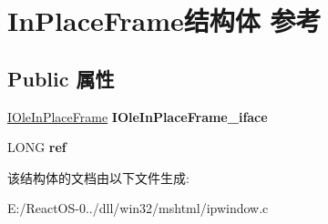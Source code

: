 \hypertarget{struct_in_place_frame}{}\section{In\+Place\+Frame结构体 参考}
\label{struct_in_place_frame}
\subsection*{Public 属性}
\begin{DoxyCompactItemize}
\item 
\mbox{\label{struct_in_place_frame_a806a9b7f7b3c9c891d8cfbcb86888657}} 
\hyperlink{interface_i_ole_in_place_frame}{I\+Ole\+In\+Place\+Frame} {\bfseries I\+Ole\+In\+Place\+Frame\+\_\+iface}
\item 
\mbox{\label{struct_in_place_frame_af3785e92d105187b3848bfb4cc9a2cdc}} 
L\+O\+NG {\bfseries ref}
\end{DoxyCompactItemize}


该结构体的文档由以下文件生成\+:\begin{DoxyCompactItemize}
\item 
E\+:/\+React\+O\+S-\/0../dll/win32/mshtml/ipwindow.\+c\end{DoxyCompactItemize}

